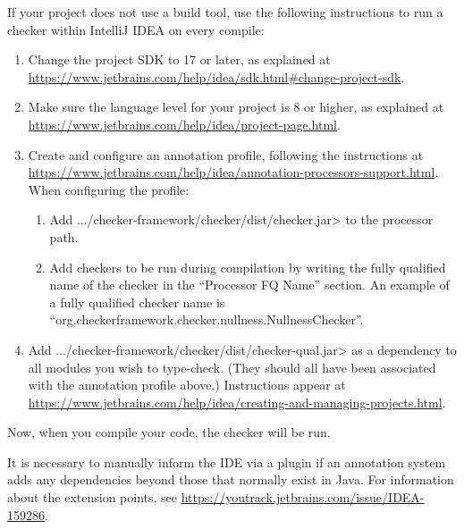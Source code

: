
If your project does not use a build tool, use the following instructions
to run a checker within IntelliJ IDEA on every compile:

\begin{enumerate}

\item Change the project SDK to 17 or later, as explained at
  \url{https://www.jetbrains.com/help/idea/sdk.html#change-project-sdk}.

\item Make sure the language level for your project is 8 or higher, as explained at
\url{https://www.jetbrains.com/help/idea/project-page.html}.

\item Create and configure an annotation profile, following the instructions at \url{https://www.jetbrains.com/help/idea/annotation-processors-support.html}.
When configuring the profile:
\begin{enumerate}
\item Add \<.../checker-framework/checker/dist/checker.jar> to the processor path.
\item Add checkers to be run during compilation by writing the
  fully qualified name of the checker in the ``Processor FQ Name''
  section.  An example of a fully qualified checker name is
  ``org.checkerframework.checker.nullness.NullnessChecker''.
\end{enumerate}

\item Add \<.../checker-framework/checker/dist/checker-qual.jar> as a dependency to all
modules you wish to type-check. (They should all have been associated with
the annotation profile above.)
Instructions appear at
\url{https://www.jetbrains.com/help/idea/creating-and-managing-projects.html}.

\end{enumerate}

Now, when you compile your code, the checker will be run.

It is necessary to manually inform the IDE via a plugin if an annotation
system adds any dependencies beyond those that normally exist in Java.
For information about the extension points, see
\url{https://youtrack.jetbrains.com/issue/IDEA-159286}.




